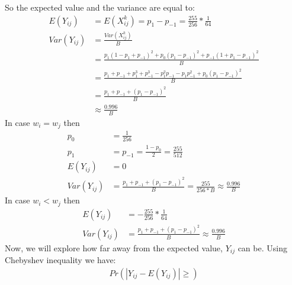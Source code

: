 \documentclass[varwidth]{standalone}
\begin{document}
So the expected value and the variance are equal to:
\begin{align*}
E(Y_{ij}) &= E(X^k_{ij}) = p_1 - p_{-1}=\frac{255}{256}*\frac{1}{64}\\
Var(Y_{ij}) &= \frac{Var(X^k_{ij})}{B}\\
            &= \frac{p_1(1-p_1+p_{-1})^2 + p_0(p_1-p_{-1})^2 + p_{-1}(1+p_1-p_{-1})^2}{B}\\
            &= \frac{p_1 + p_{-1} + p_1^3 + p_{-1}^3 - p_1^2p_{-1} - p_1p_{-1}^2 + p_0(p_1-p_{-1})^2}{B}\\
            &= \frac{p_1 + p_{-1} + (p_1-p_{-1})^2}{B}\\
            &\approx \frac{0.996}{B}
\end{align*}
In case $w_i = w_j$ then\\
\begin{align*}
p_0 &= \frac{1}{256}\\
p_1 &= p_{-1} = \frac{1-p_0}{2} = \frac{255}{512}\\
E(Y_{ij}) &= 0\\
Var(Y_{ij}) &= \frac{p_1 + p_{-1} + (p_1-p_{-1})^2}{B} = \frac{255}{256*B} \approx \frac{0.996}{B}
\end{align*}
In case $w_i < w_j$ then\\
\begin{align*}
E(Y_{ij}) &= -\frac{255}{256}*\frac{1}{64}\\
Var(Y_{ij}) &= \frac{p_1 + p_{-1} + (p_1-p_{-1})^2}{B} \approx \frac{0.996}{B}
\end{align*}
Now, we will explore how far away from the expected value, $Y_{ij}$ can be.
Using Chebyshev inequality we have:
\begin{align*}
Pr(|Y_{ij} - E(Y_{ij})| \geq)
\end{align*}
\end{document}
